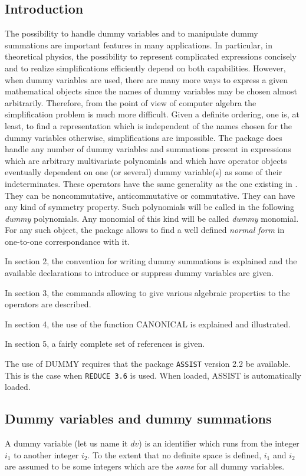 

\subsection{Introduction}
The possibility to handle dummy variables and to manipulate  
dummy summations are important features in many applications. In particular, 
in theoretical physics, the possibility to represent complicated expressions
concisely and to realize simplifications efficiently depend 
on both capabilities.
However, when dummy variables are used, there are many more  ways 
to express a given mathematical objects since 
the names of dummy variables may be chosen  almost arbitrarily.
Therefore, from the point of view of computer algebra
the simplification problem is much more difficult. 
Given a definite ordering, one is, at least, to find a representation which 
is independent of the names chosen for the dummy variables otherwise, 
simplifications are impossible.  
The package does handle any number of dummy variables and summations 
present in expressions which are arbitrary multivariate polynomials  
and which  have operator objects eventually dependent on one (or several) 
dummy variable(s) as some of their indeterminates.
These operators have the same generality as the one existing in {\REDUCE}.  
They can be noncommutative, anticommutative or commutative. They can have 
any kind of symmetry property.
Such polynomials will be called in the following {\em dummy} polynomials.
Any monomial of this kind will be called  {\em dummy} monomial.
For any such object, the package allows to find a well defined 
{\em normal form} in one-to-one correspondance with it.

In section 2, the convention for writing dummy summations is explained 
and the available declarations to introduce or suppress dummy variables
are given.

In section 3, the commands allowing to give 
various algebraic properties to the operators are described.

In section 4, the use of the function \f{CANONICAL} is 
explained and illustrated.

In section 5, a fairly complete set of references is given.

The use of DUMMY requires that the package {\tt ASSIST} 
 version 2.2 be available.
This is the case when {\tt REDUCE 3.6} is used. When loaded, ASSIST is 
automatically loaded.
\subsection{Dummy variables and dummy summations}
A dummy variable (let us name it $dv$) is an identifier which runs from 
the integer $i_1$ to another integer $i_2$. To the extent that no 
definite space is defined, $i_1$ and $i_2$ are assumed to be some 
integers which are the {\em same} for all dummy variables.

